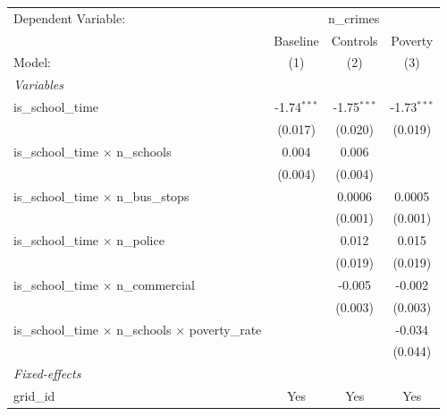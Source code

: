 
\begingroup
\centering
\begin{tabular}{lccc}
   \tabularnewline \midrule \midrule
   Dependent Variable: & \multicolumn{3}{c}{n\_crimes}\\
                                                                     & Baseline      & Controls      & Poverty \\   
   Model:                                                            & (1)           & (2)           & (3)\\  
   \midrule
   \emph{Variables}\\
   is\_school\_time                                                  & -1.74$^{***}$ & -1.75$^{***}$ & -1.73$^{***}$\\   
                                                                     & (0.017)       & (0.020)       & (0.019)\\   
   is\_school\_time $\times$ n\_schools                              & 0.004         & 0.006         &   \\   
                                                                     & (0.004)       & (0.004)       &   \\   
   is\_school\_time $\times$ n\_bus\_stops                           &               & 0.0006        & 0.0005\\   
                                                                     &               & (0.001)       & (0.001)\\   
   is\_school\_time $\times$ n\_police                               &               & 0.012         & 0.015\\   
                                                                     &               & (0.019)       & (0.019)\\   
   is\_school\_time $\times$ n\_commercial                           &               & -0.005        & -0.002\\   
                                                                     &               & (0.003)       & (0.003)\\   
   is\_school\_time $\times$ n\_schools $\times$ poverty\_rate       &               &               & -0.034\\   
                                                                     &               &               & (0.044)\\   
   \midrule
   \emph{Fixed-effects}\\
   grid\_id                                                          & Yes           & Yes           & Yes\\  

\end{tabular}
